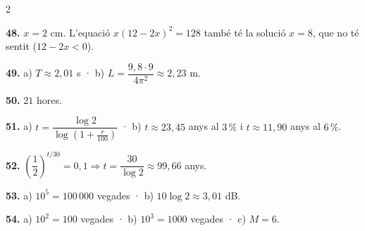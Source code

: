 \documentclass[13pt,a4paper]{extarticle}
\begin{document}
\begin{multicols}{2}
\par\noindent\begin{minipage}{\linewidth}
\textbf{48.} $x=2$ cm. L'equació $x(12-2x)^2=128$ també té la solució $x=8$, que no té sentit ($12-2x<0$).\par
\end{minipage}\par\vspace{1.6mm}
\par\noindent\begin{minipage}{\linewidth}
\textbf{49.} a) $T\approx 2{,}01$ s · b) $L=\dfrac{9{,}8\cdot 9}{4\pi^2}\approx 2{,}23$ m.\par
\end{minipage}\par\vspace{1.6mm}
\par\noindent\begin{minipage}{\linewidth}
\textbf{50.} $21$ hores.\par
\end{minipage}\par\vspace{1.6mm}
\par\noindent\begin{minipage}{\linewidth}
\textbf{51.} a) $t=\dfrac{\log 2}{\log\left(1+\frac{r}{100}\right)}$ · b) $t\approx 23{,}45$ anys al $3\,\%$ i $t\approx 11{,}90$ anys al $6\,\%$.\par
\end{minipage}\par\vspace{1.6mm}
\par\noindent\begin{minipage}{\linewidth}
\textbf{52.} $\left(\dfrac12\right)^{t/30}=0{,}1 \Rightarrow t=\dfrac{30}{\log 2}\approx 99{,}66$ anys.\par
\end{minipage}\par\vspace{1.6mm}
\par\noindent\begin{minipage}{\linewidth}
\textbf{53.} a) $10^5=100\,000$ vegades · b) $10\log 2\approx 3{,}01$ dB.\par
\end{minipage}\par\vspace{1.6mm}
\par\noindent\begin{minipage}{\linewidth}
\textbf{54.} a) $10^2=100$ vegades · b) $10^{3}=1000$ vegades · c) $M=6$.\par

\end{minipage}
\end{multicols}
\end{document}
